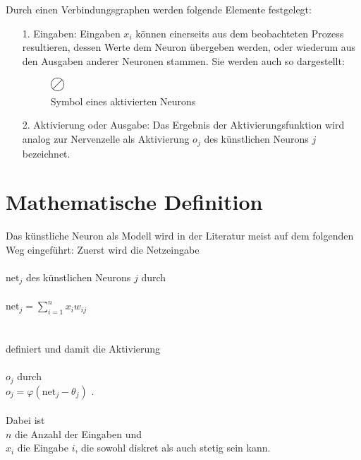 Durch einen Verbindungsgraphen werden folgende Elemente festgelegt:
\begin{itemize}
\item[1.] Eingaben: Eingaben ${\displaystyle x_{i}}$ können einerseits aus dem beobachteten Prozess resultieren, dessen Werte dem Neuron übergeben werden, oder wiederum aus den Ausgaben anderer Neuronen stammen. Sie werden auch so dargestellt:
\begin{figure}[h]
\centering
\includegraphics[width=0.5cm, height=0.5cm]{pics/input.png}
\caption[input neuron]{Symbol eines aktivierten Neurons}
\label{fig:input}
\end{figure}
\item[2.] Aktivierung oder Ausgabe: Das Ergebnis der Aktivierungsfunktion wird analog zur Nervenzelle als Aktivierung ${\displaystyle o_{j}}$ des künstlichen Neurons ${\displaystyle j}$ bezeichnet.
\end{itemize}

\section{Mathematische Definition}
Das künstliche Neuron als Modell wird in der Literatur meist auf dem folgenden Weg eingeführt:
Zuerst wird die Netzeingabe\\
\\
${\displaystyle {\mbox{net}}_{j}}$ des künstlichen Neurons ${\displaystyle j}$ durch\\ \\
${\displaystyle {\mbox{net}}_{j}=\sum _{i=1}^{n}x_{i}w_{ij}}$ \\
\\ \\
definiert und damit die Aktivierung \\
\\
${\displaystyle o_{j}}$ durch \\
${\displaystyle o_{j}=\varphi ({\mbox{net}}_{j}-\theta _{j})}$ . \\
\\
Dabei ist\\
${\displaystyle n}$  die Anzahl der Eingaben und \\
${\displaystyle x_{i}}$ die Eingabe ${\displaystyle i}$, die sowohl diskret als auch stetig sein kann. 

